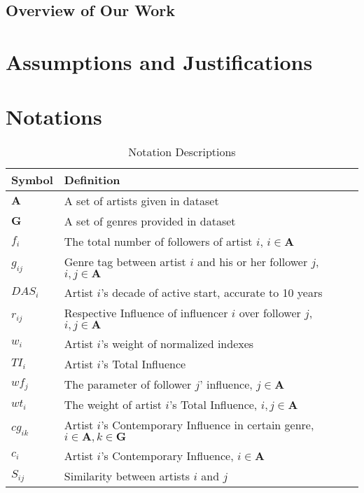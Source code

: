 \documentclass{mcmthesis}
\numberwithin{figure}{section}
\numberwithin{table}{section}
\numberwithin{equation}{section}
\begin{document}
\subsection{Overview of Our Work}




\section{Assumptions and Justifications}



\section{Notations}

\renewcommand\arraystretch{1.5}

\begin{table}[h]
  \centering
  \caption{Notation Descriptions} \label{Varibles}
  \begin{tabular}{m{2.5cm}<{\centering}|m{12.5cm}<{\centering}}
  \toprule[1.5pt]
  \textbf{Symbol} & \textbf{Definition} \\ \hline
  $\mathbf{A}$ & A set of artists given in dataset \\
  $\mathbf{G}$ & A set of genres provided in dataset \\
  $f_i$ & The total number of followers of artist $i$, $i\in \mathbf{A}$ \\
  $g_{ij}$ & Genre tag between artist $i$ and his or her follower $j$, $i,j \in \mathbf{A}$ \\
  $DAS_{i}$ & Artist $i$'s decade of active start, accurate to 10 years \\
  $r_{ij}$ & Respective Influence of influencer $i$ over follower $j$, $i,j \in \mathbf{A}$ \\
  $w_{i}$ & Artist $i$'s weight of normalized indexes \\ 
  $TI_{i} $ & Artist $i$'s Total Influence \\
  $wf_j$ & The parameter of follower $j$' influence, $j\in \mathbf{A}$ \\
  $wt_{i}$ & The weight of artist $i$'s Total Influence, $i,j\in \mathbf{A}$\\
  $cg_{ik}$ & Artist $i$'s Contemporary Influence in certain genre, $i\in \mathbf{A}, k \in \mathbf{G}$ \\
  $c_{i}$ & Artist $i$'s Contemporary Influence, $i\in \mathbf{A}$ \\
  $S_{ij} $ & Similarity between artists $i$ and $j$ \\
  \bottomrule[1.5pt]
  \end{tabular}
  \end{table}
\end{document}

